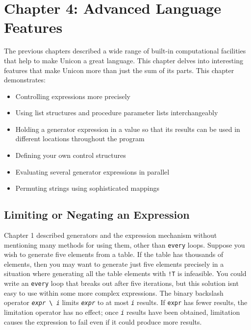 \clearpage\section{Chapter 4: Advanced Language Features}

The previous chapters described a wide range of built-in computational
facilities that help to make Unicon a great language.
This chapter delves into interesting features that make Unicon
more than just the sum of its parts. This chapter demonstrates:

\begin{itemize}\itemsep0pt
\item Controlling expressions more precisely
\item Using list structures and procedure parameter lists
interchangeably
\item Holding a generator expression in a value so that
its results can be used in different locations throughout the program
\item Defining your own control structures
\item Evaluating several generator expressions in parallel
\item Permuting strings using sophisticated mappings
\end{itemize}
\subsection[Limiting or Negating an Expression]{Limiting or Negating an
Expression}
Chapter 1 described generators and the
expression mechanism without mentioning many methods for using them,
other than \texttt{every} loops. Suppose you wish to generate five
elements from a table. If the table has thousands of elements, then you
may want to generate just five elements precisely in a situation where
generating all the table elements with \texttt{!T} is infeasible. You
could write an \texttt{every} loop that breaks out after five
iterations, but this solution isn{\textquotesingle}t easy to use within
some more complex expressions. The binary backslash operator
\texttt{\textit{expr}}\texttt{ {\textbackslash} }\texttt{\textit{i}}
limits \texttt{\textit{expr}} to at most \texttt{\textit{i}} results.
If \texttt{expr} has fewer results, the limitation operator has no
effect; once \texttt{\textit{i}} results have been obtained, limitation
causes the expression to fail even if it
could produce more results.

